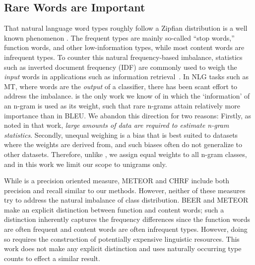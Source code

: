     

\subsection{Rare Words are Important}
\label{sec:rare-words}
That natural language word types roughly follow a Zipfian distribution is a well known phenomenon \cite{zipf1949human,powers-1998-zipf-apps}.
The frequent types are mainly so-called ``stop words,'' function words, and other low-information types, while most content words are infrequent types.
To counter this natural frequency-based imbalance, statistics such as inverted document frequency (IDF) are commonly used to weigh the \textit{input} words in applications such as information retrieval~\cite{Jones72specificity}.
In NLG tasks such as MT, where words are the \textit{output} of a classifier, there has been scant effort to address the imbalance.
\citet{doddington2002-nist} is the only work we know of in which the `information' of an n-gram is used as its weight, such that rare n-grams attain relatively more importance than in BLEU. 
We abandon this direction for two reasons:
Firstly, as noted in that work, \textit{large amounts of data are required to estimate n-gram statistics}.
Secondly, unequal weighing is a bias that is best suited to datasets where the weights are derived from, and such biases often do not generalize to other datasets.
Therefore, unlike \citet{doddington2002-nist}, we assign equal weights to all n-gram classes, and in this work we limit our scope to unigrams only.

While \bleu{} is a precision oriented measure, METEOR \cite{banerjee-lavie-2005-meteor} and CHRF \cite{popovic-2015-chrf} include both precision and recall similar to our methods.
However, neither of these measures try to address the natural imbalance of class distribution. 
BEER \cite{stanojevic-simaan-2014-beer} and METEOR \cite{denkowski-lavie-2011-meteor1.3} make an explicit distinction between function and content words; such a distinction inherently captures the frequency differences since the function words are often frequent and content words are often infrequent types. However, doing so requires the construction of potentially expensive linguistic resources. This work does not make any explicit  distinction and uses naturally occurring type counts to effect a similar result.

